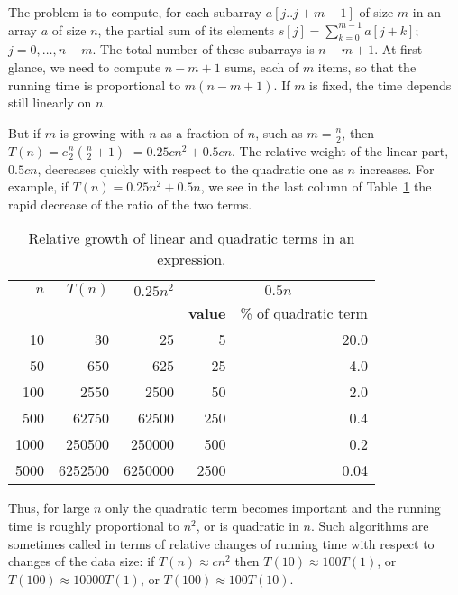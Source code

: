 \begin{Example} 
\label{ex:con:subseq} 
The problem is to compute, for each subarray
$a[j..j+m-1]$ of size \(m\) in an array
$a$ of size \(n\), the partial sum of its elements $s[j]= 
\sum_{k=0}^{m-1}a[j+k]$; \(j=0,\ldots,n-m\). The total number of these
subarrays is \(n-m+1\). At first glance, we need to compute
\(n-m+1\) sums, each  of $m$ items, so that the running time is
proportional to $m  (n-m+1)$. If $m$ is fixed, the time depends still
linearly on $n$.

But if \(m\) is growing with $n$ as
a fraction of \(n\), such as \(m=\frac{n}{2}\), 
then 
\(
T(n) = c  \frac{n}{2}  \left(\frac{n}{2}+1\right)\) \( = 
0.25cn^{2} + 0.5cn 
\). 
The relative weight of the linear part, \(0.5cn\), 
decreases quickly with respect to the quadratic one
as $n$ increases. For example, if \(T(n) = 0.25n^{2} + 0.5n\), we see in 
the last column of Table~\ref{table:quad-beats-lin} the rapid decrease of the 
ratio of the two terms.

\begin{table}[hbtp]
\caption{Relative growth of linear and quadratic terms in an expression.}
\label{table:quad-beats-lin}
\begin{center}
\begin{tabular}{|r|r|r|r|r|} \hline
$n$ & $T(n)$ & $0.25n^{2}$ & \multicolumn{2}{c|}{$0.5n$}\\ \cline{4-5}
    &        &             & \textbf{value} & \% of quadratic term \\ \hline
10  & 30     &  25  & 5  & 20.0\\
50  & 650    & 625  & 25 & 4.0\\
100 & 2550   & 2500 & 50 & 2.0\\ 
500 & 62750  & 62500 & 250 & 0.4\\
1000& 250500 &250000 & 500 & 0.2\\ 
5000& 6252500&6250000&2500 & 0.04\\\hline
\end{tabular}
\end{center}
\end{table}

Thus, for large $n$ only the quadratic term becomes important
and the running time is roughly proportional to $n^{2}$,
or is quadratic in $n$. Such algorithms are sometimes called
 in terms of relative changes of running time with
respect to changes of the data size: if \(T(n) \approx cn^2\) then $T(10)
\approx 100 T(1)$, or $T(100) \approx 10000 T(1)$, or $T(100) \approx
100 T(10)$.



\end{Example}
